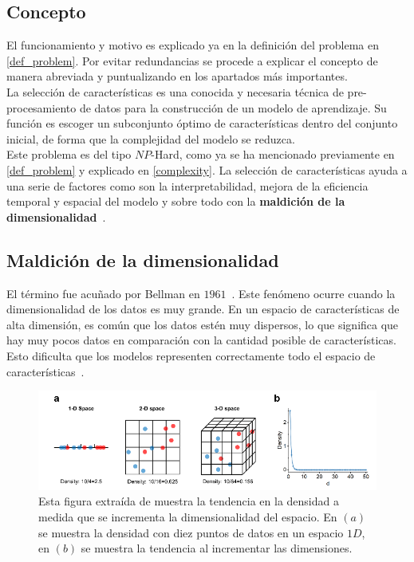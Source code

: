 \subsection{Concepto}
El funcionamiento y motivo es explicado ya en la definición del problema en \ref{def_problem}. Por evitar redundancias se procede a explicar el concepto de manera abreviada y puntualizando en los apartados más importantes.\\[6pt]
La selección de características es una conocida y necesaria técnica de pre-procesamiento de datos para la construcción de un modelo de aprendizaje. Su función es escoger un subconjunto óptimo de características dentro del conjunto inicial, de forma que la complejidad del modelo se reduzca.\\[6pt]
Este problema es del tipo $NP$-Hard, como ya se ha mencionado previamente en \ref{def_problem} y explicado en \ref{complexity}.
La selección de características ayuda a una serie de factores como son la interpretabilidad, mejora de la eficiencia temporal y espacial del modelo y sobre todo con la \textbf{maldición de la dimensionalidad}~\cite{venkat2018curse, bellman1957dynamic}.

\subsection{Maldición de la dimensionalidad}
El término fue acuñado por Bellman en $1961$~\cite{bellman1961adaptive}. Este fenómeno ocurre cuando la dimensionalidad de los datos es muy grande. En un espacio de características de alta dimensión, es común que los datos estén muy dispersos, lo que significa que hay muy pocos datos en comparación con la cantidad posible de características. Esto dificulta que los modelos representen correctamente todo el espacio de características~\cite{peng_interpreting_2024}.

\begin{figure}[H]
    \begin{center}
        \includegraphics[width=1\textwidth]{imagenes/curse-dimen-example.png}
    \end{center}
    \caption[Tendencia de incremento de dimensionalidad en varios espacios de características]{Esta figura extraída de \cite{peng_interpreting_2024} muestra la tendencia en la densidad a medida que se incrementa la dimensionalidad del espacio. En $(a)$ se muestra la densidad con diez puntos de datos en un espacio $1D$, en $(b)$ se muestra la tendencia al incrementar las dimensiones.}
\end{figure}


